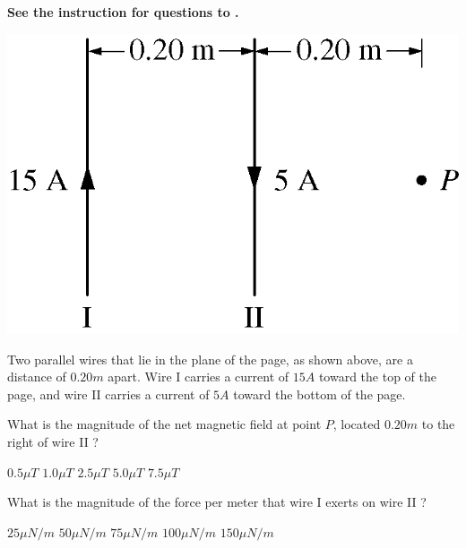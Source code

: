 \textbf{See the instruction for questions  to .}

\begin{center}
\includegraphics[scale=0.25]{images/img-012-024.png}
\end{center}

Two parallel wires that lie in the plane of the page, as shown above, are a distance of $0.20 \unit{m}$ apart. Wire I carries a current of $15 \unit{A}$ toward the top of the page, and wire II carries a current of $5 \unit{A}$ toward the bottom of the page.

\begin{questions}\setcounter{question}{23}\question
What is the magnitude of the net magnetic field at point $P$, located $0.20 \unit{m}$ to the right of wire II ?

\begin{oneparchoices}
\choice $0.5 \unit{\mu T}$
\choice $1.0 \unit{\mu T}$
\choice $2.5 \unit{\mu T}$
\choice $5.0 \unit{\mu T}$
\choice $7.5 \unit{\mu T}$
\end{oneparchoices}\end{questions}

\begin{questions}\setcounter{question}{24}\question
What is the magnitude of the force per meter that wire I exerts on wire II ?

\begin{oneparchoices}
\choice $25 \unit{\mu N/m}$
\choice $50 \unit{\mu N/m}$
\choice $75 \unit{\mu N/m}$
\choice $100 \unit{\mu N/m}$
\choice $150 \unit{\mu N/m}$
\end{oneparchoices}\end{questions}


